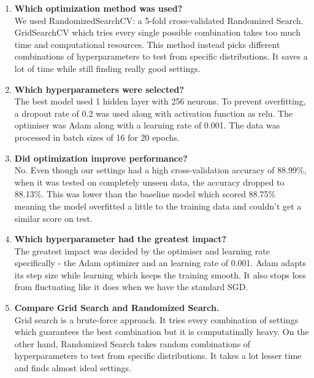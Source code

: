 \documentclass[11pt]{article}
\begin{document}
\begin{enumerate}

\item \textbf{Which optimization method was used?}\vspace{1mm}\\
We used RandomizedSearchCV: a 5-fold cross-validated Randomized Search. GridSearchCV which tries every single possible combination takes too much time and computational resources. This method instead picks different combinations of hyperparameters to test from specific distributions. It saves a lot of time while still finding really good settings.

\item \vspace{1mm}\textbf{Which hyperparameters were selected?}\vspace{1mm}\\
The best model used 1 hidden layer with 256 neurons. To prevent overfitting, a dropout rate of 0.2 was used along with activation function as relu. The optimiser was Adam along with a learning rate of 0.001. The data was processed in batch sizes of 16 for 20 epochs.

\item \vspace{1mm}\textbf{Did optimization improve performance?}\vspace{1mm}\\
No. Even though our settings had a high cross-validation accuracy of 88.99\%, when it was tested on completely unseen data, the accuracy dropped to 88.13\%. This was lower than the baseline model which scored 88.75\% meaning the model overfitted a little to the training data and couldn't get a similar score on test.

\item \vspace{1mm}\textbf{Which hyperparameter had the greatest impact?}\vspace{1mm}\\
The greatest impact was decided by the optimiser and learning rate specifically - the Adam optimizer and an learning rate of 0.001. Adam adapts its step size while learning which keeps the training smooth. It also stops loss from fluctuating like it does when we have the standard SGD.

\item \vspace{1mm}\textbf{Compare Grid Search and Randomized Search.}\vspace{1mm}\\
Grid search is a brute-force approach. It tries every combination of settings which guarantees the best combination but it is computatinally heavy. On the other hand, Randomized Search takes random combinations of hyperparameters to test from specific distributions. It takes a lot lesser time and finds almost ideal settings.


\end{enumerate}
\end{document}
